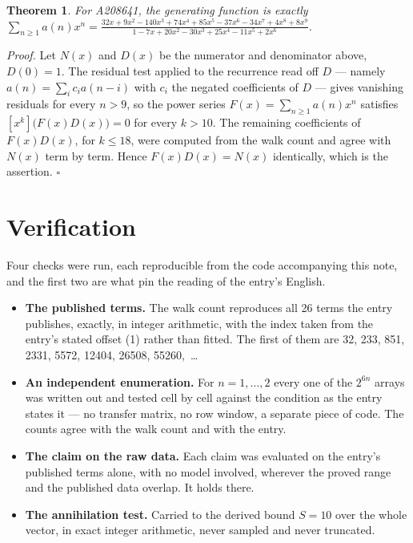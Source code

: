 \documentclass[11pt]{article}
\newtheorem{theorem}{Theorem}
\theoremstyle{definition}
\begin{document}
\begin{theorem} For A208641, the generating function is exactly $\sum_{n\ge 1} a(n)x^n = \frac{32x + 9x^{2} - 140x^{3} + 74x^{4} + 85x^{5} - 37x^{6} - 34x^{7} + 4x^{8} + 8x^{9}}{1 - 7x + 20x^{2} - 30x^{3} + 25x^{4} - 11x^{5} + 2x^{6}}$.\end{theorem}

{\itshape Proof.} Let $N(x)$ and $D(x)$ be the numerator and denominator above, $D(0)=1$. The residual test applied to the recurrence read off $D$ --- namely $a(n) = \sum_i c_i a(n-i)$ with $c_i$ the negated coefficients of $D$ --- gives vanishing residuals for every $n > 9$, so the power series $F(x)=\sum_{n\ge 1}a(n)x^n$ satisfies $[x^k]\bigl(F(x)D(x)\bigr) = 0$ for every $k > 10$. The remaining coefficients of $F(x)D(x)$, for $k \le 18$, were computed from the walk count and agree with $N(x)$ term by term. Hence $F(x)D(x) = N(x)$ identically, which is the assertion. $\square$

\section{Verification}

Four checks were run, each reproducible from the code accompanying this note, and the first two are what pin the reading of the entry's English.

\begin{itemize}

\item {\bfseries The published terms.} The walk count reproduces all 26 terms the entry publishes, exactly, in integer arithmetic, with the index taken from the entry's stated offset (1) rather than fitted. The first of them are 32, 233, 851, 2331, 5572, 12404, 26508, 55260,~\dots

\item {\bfseries An independent enumeration.} For $n = 1,\dots,2$ every one of the $2^{6n}$ arrays was written out and tested cell by cell against the condition as the entry states it --- no transfer matrix, no row window, a separate piece of code. The counts agree with the walk count and with the entry.

\item {\bfseries The claim on the raw data.} Each claim was evaluated on the entry's published terms alone, with no model involved, wherever the proved range and the published data overlap. It holds there.

\item {\bfseries The annihilation test.} Carried to the derived bound $S = 10$ over the whole vector, in exact integer arithmetic, never sampled and never truncated.

\end{itemize}
\end{document}
